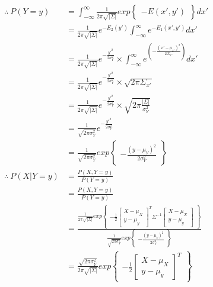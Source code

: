 \documentclass[a4paper,fleqn,11pt]{article}
\theoremstyle{mytheor}
\begin{document}
\begin{align*}
\therefore\ P (Y = y) & = \int_{-\infty}^{\infty}
			  			   \frac{1}{2\pi \sqrt{|\Sigma|}}exp \begin{Bmatrix}
						      	-E (x', y')
						   \end{Bmatrix} dx' \\
& = \frac{1}{2\pi \sqrt{|\Sigma|}} e^{-E_2 (y')}
	\int_{-\infty}^{\infty}
	e^{-E_1(x', y')} dx' \\
& = \frac{1}{2\pi \sqrt{|\Sigma|}} e^{-\frac{y'^2}{2\sigma^2_Y}} \times
	\int_{-\infty}^{\infty}
	e^{(-\frac{(x' - \mu_{x'})^2}{2\Sigma_{x'}})} dx' \\
& = \frac{1}{2\pi \sqrt{|\Sigma|}} e^{-\frac{y'^2}{2\sigma^2_Y}} \times
	\sqrt{2\pi\Sigma_{x'}} \\
& = \frac{1}{2\pi \sqrt{|\Sigma|}} e^{-\frac{y'^2}{2\sigma^2_Y}} \times
	\sqrt{2\pi\frac{|\Sigma|}{\sigma^2_Y}} \\
& = \frac{1}{\sqrt{2\pi\sigma^2_Y}} e^{-\frac{y'^2}{2\sigma^2_Y}} \\
& = \frac{1}{\sqrt{2\pi\sigma^2_Y}} exp
	\begin{Bmatrix}
	-\frac{(y - \mu_Y)^2}{2\sigma^2_Y}
	\end{Bmatrix} \\
\therefore\ P (X|Y = y) & = \frac{P (X, Y = y)}{P (Y = y)} \\
& = \frac{P (X, Y = y)}{P (Y = y)} \\
& = \frac{\frac{1}{2\pi \sqrt{|\Sigma|}}exp \begin{Bmatrix}
		      -\frac{1}{2}
  		   	  \begin{bmatrix}
				X - \mu_X \\
				y - \mu_y
			  \end{bmatrix}^T
		   	  \Sigma^{-1}
		      \begin{bmatrix}
		   		X - \mu_X \\
				y - \mu_y
			  \end{bmatrix} \end{Bmatrix}}
		 { \frac{1}{\sqrt{2\pi\sigma^2_Y}} exp
			\begin{Bmatrix}
				-\frac{(y - \mu_Y)^2}{2\sigma^2_Y}
			\end{Bmatrix} } \\
& = \frac{\sqrt{2\pi\sigma^2_Y}}{2\pi \sqrt{|\Sigma|}}
	exp \begin{Bmatrix}
		      -\frac{1}{2}
  		   	  \begin{bmatrix}
				X - \mu_X \\
				y - \mu_y
			  \end{bmatrix}^T

\end{Bmatrix}
\end{align*}
\end{document}
